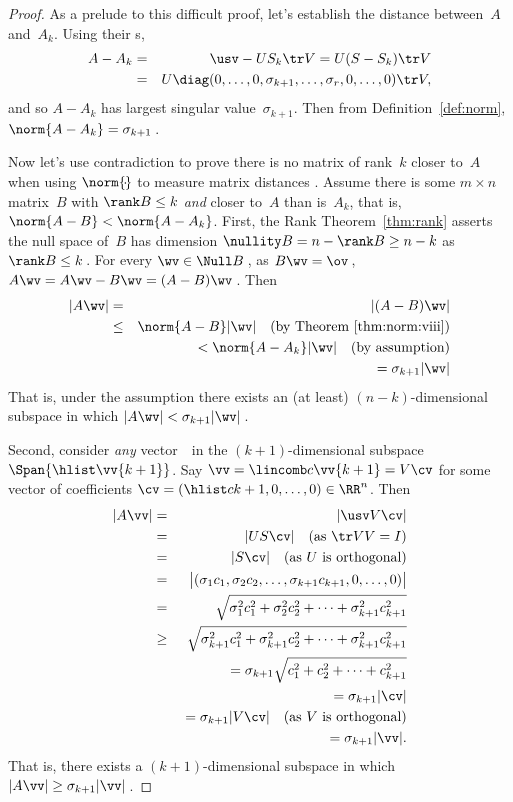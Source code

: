 \begin{proof} 
As a prelude to this difficult proof, let's establish the distance between~\(A\) and~\(A_k\). 
Using their \svd{}s,
\begin{eqnarray*}
A-A_k&=&\usv-US_k\tr V=U(S-S_k)\tr V
\\&=&U\diag(0,\ldots,0,\sigma_{k+1},\ldots,\sigma_r,0,\ldots,0)\tr V,
\end{eqnarray*}
and so \(A-A_k\) has largest singular value~\(\sigma_{k+1}\).
Then from Definition~\ref{def:norm}, \(\norm{A-A_k}=\sigma_{k+1}\)\,.

Now let's use contradiction to prove there is no matrix of rank~\(k\) closer to~\(A\) when using \(\norm{\cdot}\) to measure matrix distances \cite[p.36]{Trefethen1997}.
Assume there is some \(m\times n\) matrix~\(B\) with \(\rank B\leq k\) \emph{and}  closer to~\(A\) than is~\(A_k\), that is, \(\norm{A-B}<\norm{A-A_k}\).
First, the Rank Theorem~\ref{thm:rank} asserts the null space of~\(B\) has dimension \(\nullity B =n-\rank B\geq n-k\) as  \(\rank B\leq k\)\,.
For every \(\wv\in\Null B\)\,,  as \(B\wv=\ov\)\,,  \(A\wv=A\wv-B\wv=(A-B)\wv\)\,. 
Then
\begin{eqnarray*}
|A\wv|&=&|(A-B)\wv|
\\&\leq&\norm{A-B}|\wv| 
\quad(\text{by Theorem~\ref{thm:norm:viii}})
\\&&{}<\norm{A-A_k}|\wv|
\quad(\text{by assumption})
\\&&\phantom{{}<}{}=\sigma_{k+1}|\wv|
\end{eqnarray*}
That is, under the assumption there exists an (at least) \((n-k)\)-dimensional subspace in which \(|A\wv|<\sigma_{k+1}|\wv|\)\,.

Second, consider \emph{any} vector~\vv\ in the \((k+1)\)-dimensional subspace \(\Span\{\hlist\vv{k+1}\}\).
Say \(\vv=\lincomb c\vv{k+1}=V\cv\) for some vector of coefficients \(\cv=(\hlist c{k+1},0,\ldots,0)\in\RR^n\).
Then
\begin{eqnarray*}
|A\vv|&=&|\usv V\cv|
\\&=&|US\cv| \quad(\text{as }\tr VV=I)
\\&=&|S\cv| \quad(\text{as \(U\) is orthogonal})
\\&=&\big|(\sigma_1c_1,\sigma_2c_2,\ldots,\sigma_{k+1}c_{k+1},0,\ldots,0)\big|
\\&=&\sqrt{\sigma_1^2c_1^2+\sigma_2^2c_2^2+\cdots+\sigma_{k+1}^2c_{k+1}^2}
\\&\geq&\sqrt{\sigma_{k+1}^2c_1^2+\sigma_{k+1}^2c_2^2+\cdots+\sigma_{k+1}^2c_{k+1}^2}
\\&&{}=\sigma_{k+1}\sqrt{c_1^2+c_2^2+\cdots+c_{k+1}^2}
\\&&{}=\sigma_{k+1}|\cv|
\\&&{}=\sigma_{k+1}|V\cv|\quad(\text{as \(V\) is orthogonal})
\\&&{}=\sigma_{k+1}|\vv|.
\end{eqnarray*}
That is, there exists a \((k+1)\)-dimensional subspace in which \(|A\vv|\geq\sigma_{k+1}|\vv|\)\,.


\end{proof}
